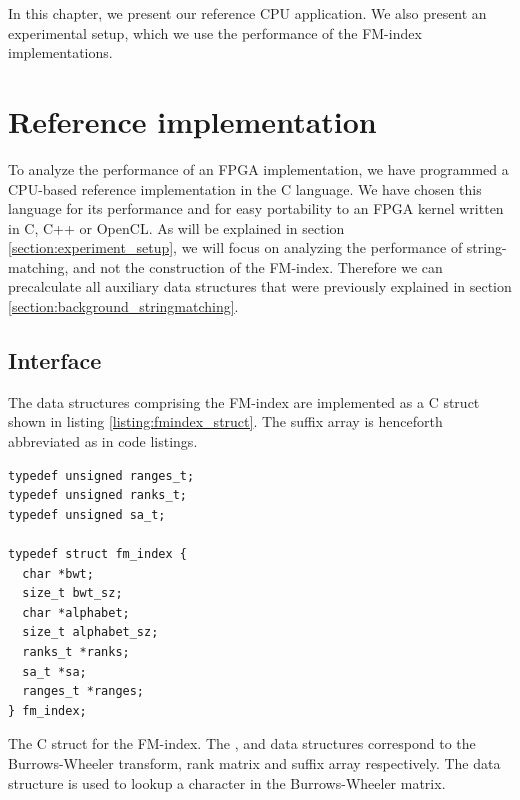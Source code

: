 In this chapter, we present our reference CPU application.
We also present an experimental setup, which we use the performance of the FM-index implementations.

\section{Reference implementation} \label{section:reference_cpu}

To analyze the performance of an FPGA implementation, we have programmed a CPU-based reference implementation in the C language.
We have chosen this language for its performance and for easy portability to an FPGA kernel written in C, C++ or OpenCL.
As will be explained in section \ref{section:experiment_setup}, we will focus on analyzing the performance of string-matching, and not the construction of the FM-index.
Therefore we can precalculate all auxiliary data structures that were previously explained in section \ref{section:background_stringmatching}.

\subsection{Interface} \label{section:cpu_interface}

The data structures comprising the FM-index are implemented as a C struct shown in listing \ref{listing:fmindex_struct}.
The suffix array is henceforth abbreviated as  in code listings.

\begin{listing}[H]
\begin{verbatim}
typedef unsigned ranges_t;
typedef unsigned ranks_t;
typedef unsigned sa_t;

typedef struct fm_index {
  char *bwt;
  size_t bwt_sz;
  char *alphabet;
  size_t alphabet_sz;
  ranks_t *ranks;
  sa_t *sa;
  ranges_t *ranges;
} fm_index;
\end{verbatim}
\caption{The C struct for the FM-index. The ,  and  data structures correspond to the Burrows-Wheeler transform, rank matrix and suffix array respectively. The data structure  is used to lookup a character in the Burrows-Wheeler matrix.}
\label{listing:fmindex_struct}
\end{listing}

